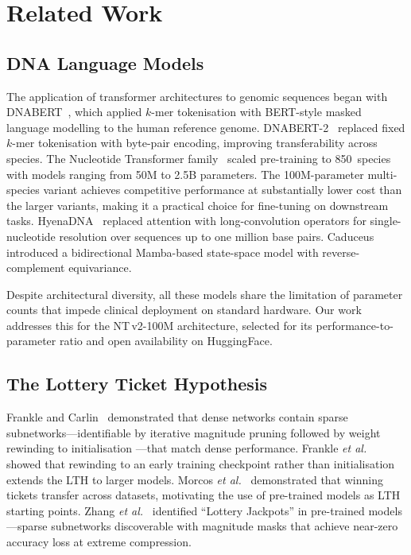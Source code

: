 \documentclass[journal]{IEEEtran}
\newcommand{\ntv}{NT\,v2-100M}
\begin{document}
\section{Related Work}
\label{sec:related}

\subsection{DNA Language Models}

The application of transformer architectures to genomic
sequences began with DNABERT~\cite{Ji2021}, which applied
$k$-mer tokenisation with BERT-style masked language modelling
to the human reference genome.
DNABERT-2~\cite{Zhou2023} replaced fixed $k$-mer tokenisation
with byte-pair encoding, improving transferability across
species.
The Nucleotide Transformer family~\cite{Dalla-Torre2023}
scaled pre-training to 850~species with models ranging from
50M to 2.5B parameters.
The 100M-parameter multi-species variant achieves competitive
performance at substantially lower cost than the larger
variants, making it a practical choice for fine-tuning on
downstream tasks.
HyenaDNA~\cite{Nguyen2024} replaced attention with
long-convolution operators for single-nucleotide
resolution over sequences up to one million base pairs.
Caduceus~\cite{Schiff2024} introduced a bidirectional
Mamba-based state-space model with reverse-complement
equivariance.

Despite architectural diversity, all these models share the
limitation of parameter counts that impede clinical
deployment on standard hardware.
Our work addresses this for the \ntv{} architecture,
selected for its performance-to-parameter ratio and
open availability on HuggingFace.

\subsection{The Lottery Ticket Hypothesis}

Frankle and Carlin~\cite{Frankle2019} demonstrated that dense
networks contain sparse subnetworks---identifiable by iterative
magnitude pruning followed by weight rewinding to initialisation
---that match dense performance.
Frankle \emph{et al.}~\cite{Frankle2020} showed that rewinding
to an early training checkpoint rather than initialisation
extends the LTH to larger models.
Morcos \emph{et al.}~\cite{Morcos2019} demonstrated that winning
tickets transfer across datasets, motivating the use of
pre-trained models as LTH starting points.
Zhang \emph{et al.}~\cite{Zhang2023} identified ``Lottery
Jackpots'' in pre-trained models---sparse subnetworks
discoverable with magnitude masks that achieve near-zero
accuracy loss at extreme compression.
\end{document}
